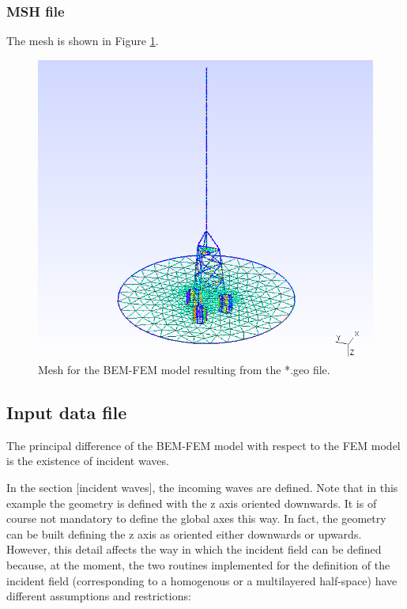 \documentclass[a4]{article}
\begin{document}
\subsubsection{MSH file}

The mesh is shown in Figure \ref{fig:mesh2}.

\begin{figure}[h!]
	\centering
	\includegraphics[scale=0.6]{mesh2.png}
	\caption{Mesh for the BEM-FEM model resulting from the *.geo file.}
	\label{fig:mesh2}
\end{figure}

\subsection{Input data file}

The principal difference of the BEM-FEM model with respect to the FEM model is the existence of incident waves.

In the section [incident waves], the incoming waves are defined. Note that in this example the geometry is defined with the z axis oriented downwards. It is of course not mandatory to define the global axes this way. In fact, the geometry can be built defining the z axis as oriented either downwards or upwards. However, this detail affects the way in which the incident field can be defined because, at the moment, the two routines implemented for the definition of the incident field (corresponding to a homogenous or a multilayered half-space) have different assumptions and restrictions:
\end{document}
